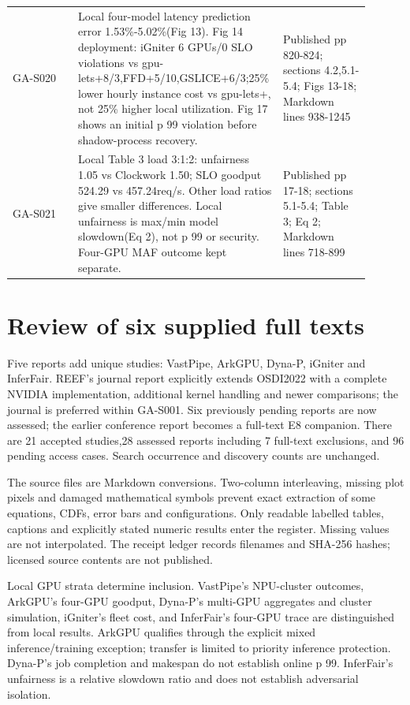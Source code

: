 \documentclass[12pt,a4paper]{article}
\begin{document}
\begin{longtable}{P{0.18\linewidth}P{0.48\linewidth}P{0.24\linewidth}}
GA-S020 \cite{igniter} & Local four-model latency prediction error 1.53\%-5.02\%(Fig 13). Fig 14 deployment: iGniter 6 GPUs/0 SLO violations vs gpu-lets+8/3,FFD+5/10,GSLICE+6/3;25\% lower hourly instance cost vs gpu-lets+, not 25\% higher local utilization. Fig 17 shows an initial p 99 violation before shadow-process recovery. & Published pp 820-824; sections 4.2,5.1-5.4; Figs 13-18; Markdown lines 938-1245\\
GA-S021 \cite{inferfair} & Local Table 3 load 3:1:2: unfairness 1.05 vs Clockwork 1.50; SLO goodput 524.29 vs 457.24req/s. Other load ratios give smaller differences. Local unfairness is max/min model slowdown(Eq 2), not p 99 or security. Four-GPU MAF outcome kept separate. & Published pp 17-18; sections 5.1-5.4; Table 3; Eq 2; Markdown lines 718-899\\
\bottomrule\end{longtable}
\section{Review of six supplied full texts}
Five reports add unique studies: VastPipe, ArkGPU, Dyna-P, iGniter and InferFair. REEF's journal report explicitly extends OSDI2022 with a complete NVIDIA implementation, additional kernel handling and newer comparisons; the journal is preferred within GA-S001. Six previously pending reports are now assessed; the earlier conference report becomes a full-text E8 companion. There are 21 accepted studies,28 assessed reports including 7 full-text exclusions, and 96 pending access cases. Search occurrence and discovery counts are unchanged.

The source files are Markdown conversions. Two-column interleaving, missing plot pixels and damaged mathematical symbols prevent exact extraction of some equations, CDFs, error bars and configurations. Only readable labelled tables, captions and explicitly stated numeric results enter the register. Missing values are not interpolated. The receipt ledger records filenames and SHA-256 hashes; licensed source contents are not published.

Local GPU strata determine inclusion. VastPipe's NPU-cluster outcomes, ArkGPU's four-GPU goodput, Dyna-P's multi-GPU aggregates and cluster simulation, iGniter's fleet cost, and InferFair's four-GPU trace are distinguished from local results. ArkGPU qualifies through the explicit mixed inference/training exception; transfer is limited to priority inference protection. Dyna-P's job completion and makespan do not establish online p 99. InferFair's unfairness is a relative slowdown ratio and does not establish adversarial isolation.
\end{document}
